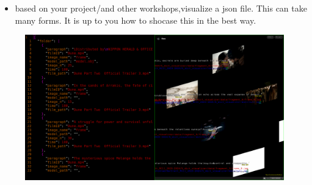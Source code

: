 \documentclass[11pt, a4paper, twoside]{article}
\begin{document}
	\begin{itemize}
		\item based on your project/and other workshops,visualize a json file. This can take many forms. It is up to you how to shocase this in the best way.
	\end{itemize}

	\begin{figure}[h]
		\includegraphics[width=\textwidth]{media/json_visualizer.png}
	\end{figure}
\end{document}
